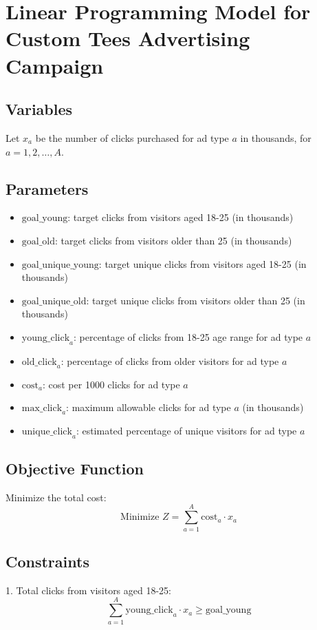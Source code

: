 \documentclass{article}
\begin{document}
\section*{Linear Programming Model for Custom Tees Advertising Campaign}

\subsection*{Variables}
Let \( x_a \) be the number of clicks purchased for ad type \( a \) in thousands, for \( a = 1, 2, \ldots, A \).

\subsection*{Parameters}
\begin{itemize}
    \item \( \text{goal\_young} \): target clicks from visitors aged 18-25 (in thousands)
    \item \( \text{goal\_old} \): target clicks from visitors older than 25 (in thousands)
    \item \( \text{goal\_unique\_young} \): target unique clicks from visitors aged 18-25 (in thousands)
    \item \( \text{goal\_unique\_old} \): target unique clicks from visitors older than 25 (in thousands)
    \item \( \text{young\_click}_a \): percentage of clicks from 18-25 age range for ad type \( a \)
    \item \( \text{old\_click}_a \): percentage of clicks from older visitors for ad type \( a \)
    \item \( \text{cost}_a \): cost per 1000 clicks for ad type \( a \)
    \item \( \text{max\_click}_a \): maximum allowable clicks for ad type \( a \) (in thousands)
    \item \( \text{unique\_click}_a \): estimated percentage of unique visitors for ad type \( a \)
\end{itemize}

\subsection*{Objective Function}
Minimize the total cost:
\[
\text{Minimize } Z = \sum_{a=1}^{A} \text{cost}_a \cdot x_a
\]

\subsection*{Constraints}
1. Total clicks from visitors aged 18-25:
\[
\sum_{a=1}^{A} \text{young\_click}_a \cdot x_a \geq \text{goal\_young}
\]
\end{document}
